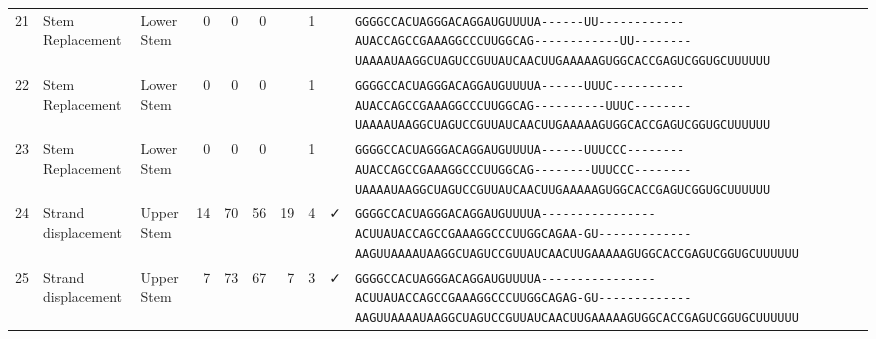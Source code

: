 \begin{tabular}{rllrrrrrcl}
 21 & Stem Replacement & Lower Stem & 0 & 0 & 0 &  & 1 &  &
 \color{ucsfdarkgrey}\verb|GGGGCCACUAGGGACAGGAU|\color{ucsforange}\verb|GUUUUA|\color{ucsfblue}\verb|------UU------------|\color{ucsfpurple}\verb|AUACCAGCCGAAAGGCCCUUGGCAG|\color{ucsfblue}\verb|------------UU--------|\color{ucsforange}\verb|UAAAAUAA|\color{ucsfnavy}\verb|GGCUAGUCC|\color{ucsforange}\verb|GUUAUCA|\color{ucsfteal}\verb|ACUUGAAAAAGUG|\color{ucsforange}\verb|GCACCGAGUCGGUGCUUUUUU| \\

 22 & Stem Replacement & Lower Stem & 0 & 0 & 0 &  & 1 &  &
 \color{ucsfdarkgrey}\verb|GGGGCCACUAGGGACAGGAU|\color{ucsforange}\verb|GUUUUA|\color{ucsfblue}\verb|------UUUC----------|\color{ucsfpurple}\verb|AUACCAGCCGAAAGGCCCUUGGCAG|\color{ucsfblue}\verb|----------UUUC--------|\color{ucsforange}\verb|UAAAAUAA|\color{ucsfnavy}\verb|GGCUAGUCC|\color{ucsforange}\verb|GUUAUCA|\color{ucsfteal}\verb|ACUUGAAAAAGUG|\color{ucsforange}\verb|GCACCGAGUCGGUGCUUUUUU| \\

 23 & Stem Replacement & Lower Stem & 0 & 0 & 0 &  & 1 &  &
 \color{ucsfdarkgrey}\verb|GGGGCCACUAGGGACAGGAU|\color{ucsforange}\verb|GUUUUA|\color{ucsfblue}\verb|------UUUCCC--------|\color{ucsfpurple}\verb|AUACCAGCCGAAAGGCCCUUGGCAG|\color{ucsfblue}\verb|--------UUUCCC--------|\color{ucsforange}\verb|UAAAAUAA|\color{ucsfnavy}\verb|GGCUAGUCC|\color{ucsforange}\verb|GUUAUCA|\color{ucsfteal}\verb|ACUUGAAAAAGUG|\color{ucsforange}\verb|GCACCGAGUCGGUGCUUUUUU| \\

 24 & Strand displacement & Upper Stem & 14 & 70 & 56 & 19 & 4 & ✓ &
 \color{ucsfdarkgrey}\verb|GGGGCCACUAGGGACAGGAU|\color{ucsforange}\verb|GUUUUA|\color{ucsfblue}\verb|----------------ACUU|\color{ucsfpurple}\verb|AUACCAGCCGAAAGGCCCUUGGCAG|\color{ucsfblue}\verb|AA-GU-------------AAGU|\color{ucsforange}\verb|UAAAAUAA|\color{ucsfnavy}\verb|GGCUAGUCC|\color{ucsforange}\verb|GUUAUCA|\color{ucsfteal}\verb|ACUUGAAAAAGUG|\color{ucsforange}\verb|GCACCGAGUCGGUGCUUUUUU| \\

 25 & Strand displacement & Upper Stem & 7 & 73 & 67 & 7 & 3 & ✓ &
 \color{ucsfdarkgrey}\verb|GGGGCCACUAGGGACAGGAU|\color{ucsforange}\verb|GUUUUA|\color{ucsfblue}\verb|----------------ACUU|\color{ucsfpurple}\verb|AUACCAGCCGAAAGGCCCUUGGCAG|\color{ucsfblue}\verb|AG-GU-------------AAGU|\color{ucsforange}\verb|UAAAAUAA|\color{ucsfnavy}\verb|GGCUAGUCC|\color{ucsforange}\verb|GUUAUCA|\color{ucsfteal}\verb|ACUUGAAAAAGUG|\color{ucsforange}\verb|GCACCGAGUCGGUGCUUUUUU| \\


\end{tabular}

